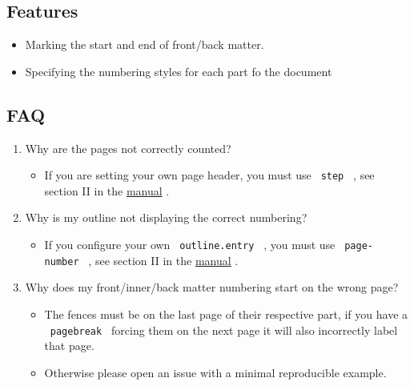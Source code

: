 
\subsection{Features}\label{features}

\begin{itemize}
\tightlist
\item
  Marking the start and end of front/back matter.
\item
  Specifying the numbering styles for each part fo the document
\end{itemize}

\subsection{FAQ}\label{faq}

\begin{enumerate}
\tightlist
\item
  Why are the pages not correctly counted?

  \begin{itemize}
  \tightlist
  \item
    If you are setting your own page header, you must use
    \texttt{\ step\ } , see section II in the
    \href{https://github.com/typst/packages/raw/main/packages/preview/anti-matter/0.1.1/docs/manual.pdf}{manual}
    .
  \end{itemize}
\item
  Why is my outline not displaying the correct numbering?

  \begin{itemize}
  \tightlist
  \item
    If you configure your own \texttt{\ outline.entry\ } , you must use
    \texttt{\ page-number\ } , see section II in the
    \href{https://github.com/typst/packages/raw/main/packages/preview/anti-matter/0.1.1/docs/manual.pdf}{manual}
    .
  \end{itemize}
\item
  Why does my front/inner/back matter numbering start on the wrong page?

  \begin{itemize}
  \tightlist
  \item
    The fences must be on the last page of their respective part, if you
    have a \texttt{\ pagebreak\ } forcing them on the next page it will
    also incorrectly label that page.
  \item
    Otherwise please open an issue with a minimal reproducible example.
  \end{itemize}
\end{enumerate}

